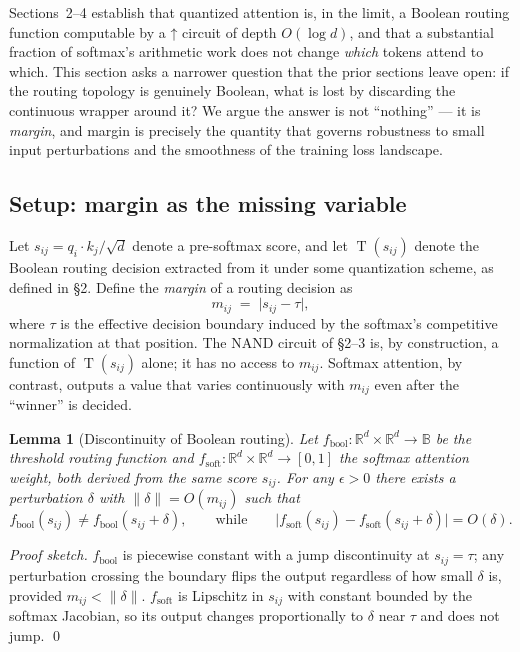 \documentclass[11pt]{article}
\newtheorem{lemma}[theorem]{Lemma}
\theoremstyle{definition}
\newcommand{\RR}{\mathbb{R}}
\newcommand{\BB}{\mathbb{B}}
\newcommand{\nand}{\mathbin{\uparrow}}
\newcommand{\threshold}{\operatorname{T}}
\begin{document}
Sections~2--4 establish that quantized attention is, in the limit, a Boolean
routing function computable by a $\nand$ circuit of depth $O(\log d)$, and
that a substantial fraction of softmax's arithmetic work does not change
\emph{which} tokens attend to which. This section asks a narrower question
that the prior sections leave open: if the routing topology is genuinely
Boolean, what is lost by discarding the continuous wrapper around it? We
argue the answer is not ``nothing'' --- it is \emph{margin}, and margin is
precisely the quantity that governs robustness to small input perturbations
and the smoothness of the training loss landscape.

\subsection{Setup: margin as the missing variable}

Let $s_{ij} = q_i \cdot k_j / \sqrt{d}$ denote a pre-softmax score, and let
$\threshold(s_{ij})$ denote the Boolean routing decision extracted from it
under some quantization scheme, as defined in \S2. Define the \emph{margin}
of a routing decision as
\[
  m_{ij} \;=\; \bigl| s_{ij} - \tau \bigr|,
\]
where $\tau$ is the effective decision boundary induced by the softmax's
competitive normalization at that position. The NAND circuit of \S2--3 is,
by construction, a function of $\threshold(s_{ij})$ alone; it has no access
to $m_{ij}$. Softmax attention, by contrast, outputs a value that varies
continuously with $m_{ij}$ even after the ``winner'' is decided.

\begin{lemma}[Discontinuity of Boolean routing]
\label{lem:discontinuity}
Let $f_{\mathrm{bool}}: \RR^d \times \RR^d \to \BB$ be the threshold routing
function and $f_{\mathrm{soft}}: \RR^d \times \RR^d \to [0,1]$ the softmax
attention weight, both derived from the same score $s_{ij}$. For any
$\epsilon > 0$ there exists a perturbation $\delta$ with $\|\delta\| =
O(m_{ij})$ such that
\[
  f_{\mathrm{bool}}(s_{ij}) \neq f_{\mathrm{bool}}(s_{ij} + \delta),
  \qquad \text{while} \qquad
  \bigl| f_{\mathrm{soft}}(s_{ij}) - f_{\mathrm{soft}}(s_{ij}+\delta) \bigr|
  = O(\delta).
\]
\end{lemma}

\begin{proof}[Proof sketch]
$f_{\mathrm{bool}}$ is piecewise constant with a jump discontinuity at
$s_{ij} = \tau$; any perturbation crossing the boundary flips the output
regardless of how small $\delta$ is, provided $m_{ij} < \|\delta\|$.
$f_{\mathrm{soft}}$ is Lipschitz in $s_{ij}$ with constant bounded by the
softmax Jacobian, so its output changes proportionally to $\delta$ near
$\tau$ and does not jump. \qed
\end{proof}
\end{document}
